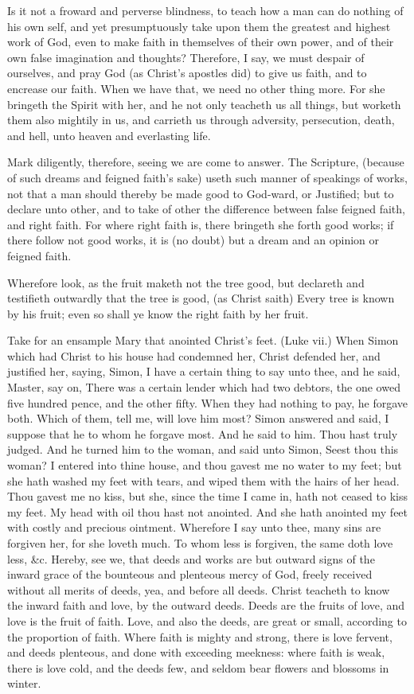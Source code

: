 Is it not a froward and perverse blindness, to teach how 
a man can do nothing of his own self, and yet
presumptuously take upon them the greatest and highest work of 
God, even to make faith in themselves of their own power, 
and of their own false imagination and thoughts?
Therefore, I say, we must despair of ourselves, and pray God 
(as Christ's apostles did) to give us faith, and to encrease 
our faith. When we have that, we need no other thing 
more. For she bringeth the Spirit with her, and he not 
only teacheth us all things, but worketh them also mightily 
in us, and carrieth us through adversity, persecution, death, 
and hell, unto heaven and everlasting life. 


Mark diligently, therefore, seeing we are come to
answer. The Scripture, (because of such dreams and feigned 
faith's sake) useth such manner of speakings of works, 
not that a man should thereby be made good to God-ward, 
or Justified; but to declare unto other, and to take of 
other the difference between false feigned faith, and right 
faith. For where right faith is, there bringeth she forth 
good works; if there follow not good works, it is (no 
doubt) but a dream and an opinion or feigned faith. 

Wherefore look, as the fruit maketh not the tree good, 
but declareth and testifieth outwardly that the tree is good, 
(as Christ saith) Every tree is known by his fruit; even 
so shall ye know the right faith by her fruit. 

Take for an ensample Mary that anointed Christ's feet. 
(Luke vii.) When Simon which had Christ to his house 
had condemned her, Christ defended her, and justified her, 
saying, Simon, I have a certain thing to say unto thee, and 
he said, Master, say on, There was a certain lender which 
had two debtors, the one owed five hundred pence, and 
the other fifty. When they had nothing to pay, he forgave 
both. Which of them, tell me, will love him most?
Simon answered and said, I suppose that he to whom he
forgave most. And he said to him. Thou hast truly judged. 
And he turned him to the woman, and said unto Simon, 
Seest thou this woman? I entered into thine house, and 
thou gavest me no water to my feet; but she hath washed 
my feet with tears, and wiped them with the hairs of her 
head. Thou gavest me no kiss, but she, since the time I 
came in, hath not ceased to kiss my feet. My head with
oil thou hast not anointed. And she hath anointed my feet
with costly and precious ointment. Wherefore I say unto 
thee, many sins are forgiven her, for she loveth much. To 
whom less is forgiven, the same doth love less, \&c. 
Hereby, see we, that deeds and works are but outward 
signs of the inward grace of the bounteous and plenteous 
mercy of God, freely received without all merits of deeds, 
yea, and before all deeds. Christ teacheth to know the 
inward faith and love, by the outward deeds. Deeds are the 
fruits of love, and love is the fruit of faith. Love, and 
also the deeds, are great or small, according to the
proportion of faith. Where faith is mighty and strong, there 
is love fervent, and deeds plenteous, and done with
exceeding meekness: where faith is weak, there is love cold, 
and the deeds few, and seldom bear flowers and blossoms 
in winter. 


